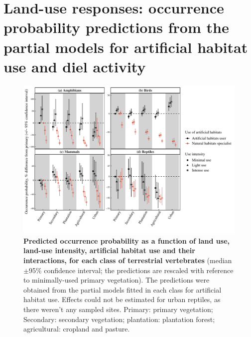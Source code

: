 \clearpage
\section{Land-use responses: occurrence probability predictions from the partial models for artificial habitat use and diel activity}

\begin{figure}[h!]
\centering
\includegraphics[scale=0.7]{Supporting/Chapter4/Figures/Partial_models_predictions/Specialisation}
\caption[Predicted occurrence probability as a function of land use, land-use intensity, artificial habitat use and their interactions in each class]{\textbf{Predicted occurrence probability as a function of land use, land-use intensity, artificial habitat use and their interactions, for each class of terrestrial vertebrates} (median $\pm$95\% confidence interval; the predictions are rescaled with reference to minimally-used primary vegetation). The predictions were obtained from the partial models fitted in each class for artificial habitat use. Effects could not be estimated for urban reptiles, as there weren't any sampled sites. Primary: primary vegetation; Secondary: secondary vegetation; plantation: plantation forest; agricultural: cropland and pasture.}
\label{SI_4_Figure10}
\end{figure}

